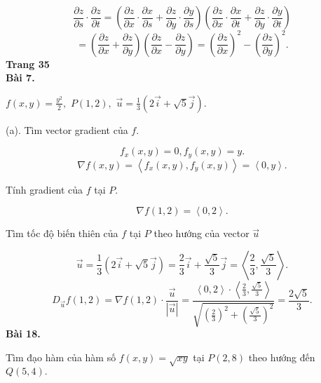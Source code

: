\documentclass[12pt,a4paper]{article}
\begin{document}
\[\frac{{\partial z}}{{\partial s}} \cdot \frac{{\partial z}}{{\partial t}} = \left( {\frac{{\partial z}}{{\partial x}} \cdot \frac{{\partial x}}{{\partial s}} + \frac{{\partial z}}{{\partial y}} \cdot \frac{{\partial y}}{{\partial s}}} \right)\left( {\frac{{\partial z}}{{\partial x}} \cdot \frac{{\partial x}}{{\partial t}} + \frac{{\partial z}}{{\partial y}} \cdot \frac{{\partial y}}{{\partial t}}} \right)\]
\[ = \left( {\frac{{\partial z}}{{\partial x}} + \frac{{\partial z}}{{\partial y}}} \right)\left( {\frac{{\partial z}}{{\partial x}} - \frac{{\partial z}}{{\partial y}}} \right) = {\left( {\frac{{\partial z}}{{\partial x}}} \right)^2} - {\left( {\frac{{\partial z}}{{\partial y}}} \right)^2}.\]
\textbf{Trang 35}\\
\textbf{Bài 7.}
\begin{mybox}
\(f\left( {x,y} \right) = \frac{{{y^2}}}{2},\) \(P\left( {1,2} \right),\) \(\overrightarrow u  = \frac{1}{3}\left( {2\overrightarrow i  + \sqrt 5 \overrightarrow j } \right).\)
\end{mybox}
\begin{mybox}
(a). Tìm vector gradient của \(f.\)
\end{mybox}
\[{f_x}\left( {x,y} \right) = 0,{f_y}\left( {x,y} \right) = y.\]
\[\nabla f\left( {x,y} \right) = \left\langle {{f_x}\left( {x,y} \right),{f_y}\left( {x,y} \right)} \right\rangle  = \left\langle {0,y} \right\rangle .\]
\begin{mybox}
Tính gradient của \(f\) tại \(P.\)
\end{mybox}
\[\nabla f\left( {1,2} \right) = \left\langle {0,2} \right\rangle .\]
\begin{mybox}
Tìm tốc độ biến thiên của \(f\) tại \(P\) theo hướng của vector \(\overrightarrow u \)
\end{mybox}
\[\overrightarrow u  = \frac{1}{3}\left( {2\overrightarrow i  + \sqrt 5 \overrightarrow j } \right) = \frac{2}{3}\overrightarrow i  + \frac{{\sqrt 5 }}{3}\overrightarrow j  = \left\langle {\frac{2}{3},\frac{{\sqrt 5 }}{3}} \right\rangle .\]
\[{D_{\overrightarrow u }}f\left( {1,2} \right) = \nabla f\left( {1,2} \right) \cdot \frac{{\overrightarrow u }}{{\left| {\overrightarrow u } \right|}} = \frac{{\left\langle {0,2} \right\rangle  \cdot \left\langle {\frac{2}{3},\frac{{\sqrt 5 }}{3}} \right\rangle }}{{\sqrt {{{\left( {\frac{2}{3}} \right)}^2} + {{\left( {\frac{{\sqrt 5 }}{3}} \right)}^2}} }} = \frac{{2\sqrt 5 }}{3}.\]
\textbf{Bài 18.}
\begin{mybox}
Tìm đạo hàm của hàm số \(f\left( {x,y} \right) = \sqrt {xy} \) tại \(P\left( {2,8} \right)\) theo hướng đến \(Q\left( {5,4} \right).\)
\end{mybox} 
\end{document}
